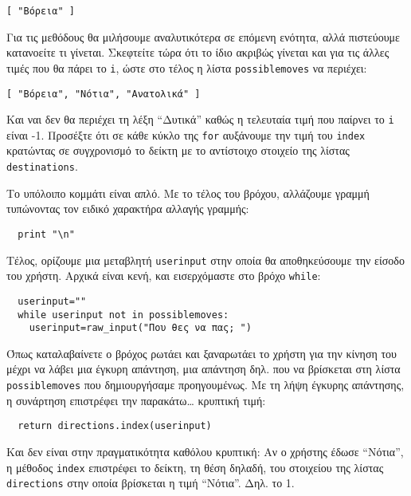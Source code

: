 \begin{verbatim}
[ "Βόρεια" ]
\end{verbatim}

Για τις μεθόδους θα μιλήσουμε αναλυτικότερα σε επόμενη ενότητα, αλλά
πιστεύουμε κατανοείτε τι γίνεται. Σκεφτείτε τώρα ότι το ίδιο ακριβώς
γίνεται και για τις άλλες τιμές που θα πάρει το {\tt i}, ώστε στο τέλος η
λίστα {\tt possiblemoves} να περιέχει:

\begin{verbatim}
[ "Βόρεια", "Νότια", "Ανατολικά" ]
\end{verbatim}

Και ναι δεν θα περιέχει τη λέξη ``Δυτικά'' καθώς η τελευταία τιμή που
παίρνει το {\tt i} είναι -1.  Προσέξτε ότι σε κάθε κύκλο της {\tt for} αυξάνουμε την
τιμή του {\tt index} κρατώντας σε συγχρονισμό το δείκτη με το
αντίστοιχο στοιχείο της λίστας {\tt destinations}.

Το υπόλοιπο κομμάτι είναι απλό. Με το τέλος του βρόχου, αλλάζουμε γραμμή
τυπώνοντας τον ειδικό χαρακτήρα αλλαγής γραμμής:

\begin{verbatim}
  print "\n"
\end{verbatim}

Τέλος, ορίζουμε μια μεταβλητή {\tt userinput} στην οποία θα
αποθηκεύσουμε την είσοδο του χρήστη. Αρχικά είναι κενή, και εισερχόμαστε
στο βρόχο {\tt while}:

\begin{verbatim}
  userinput=""
  while userinput not in possiblemoves:
    userinput=raw_input("Που θες να πας; ")
\end{verbatim}

Όπως καταλαβαίνετε ο βρόχος ρωτάει και ξαναρωτάει το χρήστη για την
κίνηση του μέχρι να λάβει μια έγκυρη απάντηση, μια απάντηση δηλ. που
να βρίσκεται στη λίστα {\tt possiblemoves} που δημιουργήσαμε
προηγουμένως. Με τη λήψη έγκυρης απάντησης, η συνάρτηση επιστρέφει την παρακάτω\ldots{}
κρυπτική τιμή:

\begin{verbatim}
  return directions.index(userinput)
\end{verbatim}

Και δεν είναι στην πραγματικότητα καθόλου κρυπτική: Αν ο χρήστης έδωσε
``Νότια'', η μέθοδος {\tt index} επιστρέφει το δείκτη, τη θέση δηλαδή,
του στοιχείου της λίστας {\tt directions} στην οποία βρίσκεται η τιμή
   ``Νότια''. Δηλ. το 1.

